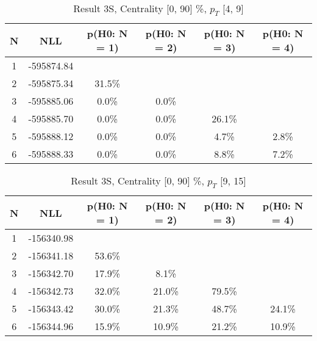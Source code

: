 \begin{table}[htb]
	\begin{center}
	\caption{Result 3S, Centrality [0, 90] \%, $p_{T}$ [4, 9] \GeV
}
{\footnotesize\renewcommand{\arraystretch}{1.4}
		\begin{tabular}{cc||cccc}
			N & NLL & p(H0: N = 1) & p(H0: N = 2) & p(H0: N = 3) & p(H0: N = 4)\\ 
		\hline
1 & -595874.84 & & & &\\
2 & -595875.34 & 31.5\% & & &\\
3 & -595885.06 & 0.0\% & 0.0\% & &\\
4 & -595885.70 & 0.0\% & 0.0\% & 26.1\% &\\
5 & -595888.12 & 0.0\% & 0.0\% & 4.7\% & 2.8\%\\
6 & -595888.33 & 0.0\% & 0.0\% & 8.8\% & 7.2\% \\
	\end{tabular}
		\label{tab:lab}
	}
	\end{center}\end{table}

\begin{table}[htb]
	\begin{center}
	\caption{Result 3S, Centrality [0, 90] \%, $p_{T}$ [9, 15] \GeV
}
{\footnotesize\renewcommand{\arraystretch}{1.4}
		\begin{tabular}{cc||>{\columncolor[gray]{0.8}}cccc}
			N & NLL & p(H0: N = 1) & p(H0: N = 2) & p(H0: N = 3) & p(H0: N = 4)\\ 
		\hline
1 & -156340.98 & & & &\\
2 & -156341.18 & 53.6\% & & &\\
3 & -156342.70 & 17.9\% & 8.1\% & &\\
4 & -156342.73 & 32.0\% & 21.0\% & 79.5\% &\\
5 & -156343.42 & 30.0\% & 21.3\% & 48.7\% & 24.1\%\\
6 & -156344.96 & 15.9\% & 10.9\% & 21.2\% & 10.9\% \\
	\end{tabular}
		\label{tab:lab}
	}
	\end{center}\end{table}

